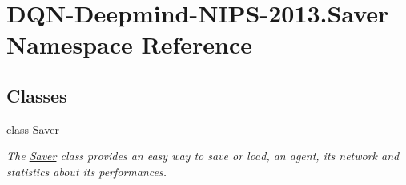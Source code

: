 \hypertarget{namespaceDQN-Deepmind-NIPS-2013_1_1Saver}{}\section{D\+Q\+N-\/\+Deepmind-\/\+N\+I\+P\+S-\/2013.Saver Namespace Reference}
\label{namespaceDQN-Deepmind-NIPS-2013_1_1Saver}
\subsection*{Classes}
\begin{DoxyCompactItemize}
\item 
class \hyperlink{classDQN-Deepmind-NIPS-2013_1_1Saver_1_1Saver}{Saver}
\begin{DoxyCompactList}\small\item\em The \hyperlink{classDQN-Deepmind-NIPS-2013_1_1Saver_1_1Saver}{Saver} class provides an easy way to save or load, an agent, its network and statistics about its performances. \end{DoxyCompactList}\end{DoxyCompactItemize}
